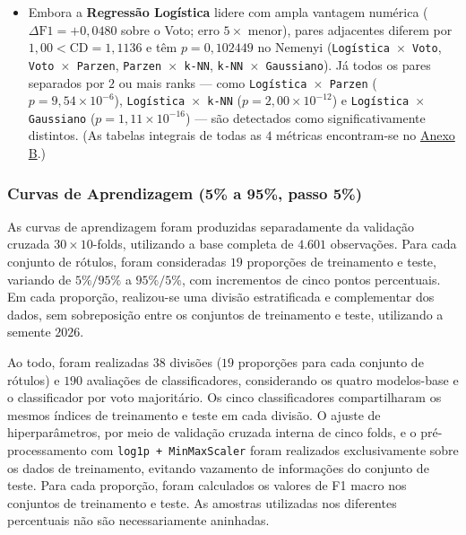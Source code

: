 \documentclass[a4paper,11pt]{article}
\begin{document}
\begin{itemize}[leftmargin=1.5em, itemsep=0.25em, topsep=0.25em]
\begin{itemize}[leftmargin=1.5em, itemsep=0.25em, topsep=0.25em]
  \item Embora a \textbf{Regressão Logística} lidere com ampla vantagem numérica ($\Delta \text{F1} = +0,0480$ sobre o Voto; erro $5 \times$ menor), pares adjacentes diferem por $1,00 < \text{CD} = 1,1136$ e têm $p = 0,102449$ no Nemenyi (\texttt{Logística \ensuremath{\times} Voto}, \texttt{Voto \ensuremath{\times} Parzen}, \texttt{Parzen \ensuremath{\times} k-NN}, \texttt{k-NN \ensuremath{\times} Gaussiano}). Já todos os pares separados por $2$ ou mais ranks --- como \texttt{Logística \ensuremath{\times} Parzen} ($p = 9,54 \times 10^{-6}$), \texttt{Logística \ensuremath{\times} k-NN} ($p = 2,00 \times 10^{-12}$) e \texttt{Logística \ensuremath{\times} Gaussiano} ($p = 1,11 \times 10^{-16}$) --- são detectados como significativamente distintos. (As tabelas integrais de todas as $4$ métricas encontram-se no \hyperref[sec:anexo-b-tabelas-completas-de-ranks-medios-e-pos-teste-de-nemenyi-todas-as-metricas]{Anexo B}.)
\end{itemize}
\end{itemize}
\subsubsection{Curvas de Aprendizagem (5\% a 95\%, passo 5\%)}\label{sec:2-3-5-curvas-de-aprendizagem-5-a-95-passo-5}


As curvas de aprendizagem foram produzidas separadamente da validação cruzada $30 \times 10$-folds, utilizando a base completa de $4.601$ observações. Para cada conjunto de rótulos, foram consideradas $19$ proporções de treinamento e teste, variando de $5\%/95\%$ a $95\%/5\%$, com incrementos de cinco pontos percentuais. Em cada proporção, realizou-se uma divisão estratificada e complementar dos dados, sem sobreposição entre os conjuntos de treinamento e teste, utilizando a semente $2026$.

Ao todo, foram realizadas $38$ divisões ($19$ proporções para cada conjunto de rótulos) e $190$ avaliações de classificadores, considerando os quatro modelos-base e o classificador por voto majoritário. Os cinco classificadores compartilharam os mesmos índices de treinamento e teste em cada divisão. O ajuste de hiperparâmetros, por meio de validação cruzada interna de cinco folds, e o pré-processamento com \texttt{log1p + MinMaxScaler} foram realizados exclusivamente sobre os dados de treinamento, evitando vazamento de informações do conjunto de teste. Para cada proporção, foram calculados os valores de F1 macro nos conjuntos de treinamento e teste. As amostras utilizadas nos diferentes percentuais não são necessariamente aninhadas.
\end{document}
